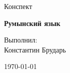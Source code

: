 \begin{titlepage}
    \centering

    \vspace*{\fill}

    {\LARGE Конспект}

    {\Huge\bfseries Румынский язык}

    \vfill

    \hfill \begin{minipage}{0.5\textwidth}
        \begin{flushleft}
            Выполнил: \\
            Константин Брударь
        \end{flushleft}
    \end{minipage}

    \vfill

    {\large \today}
\end{titlepage}
